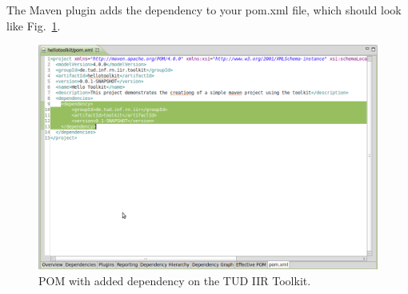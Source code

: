 \documentclass[a4paper,twoside]{book}      %
\begin{document}
The Maven plugin adds the dependency to your pom.xml file, which should look like Fig.~\ref{fig:pom01}.
\begin{figure}
\includegraphics[width=\textwidth]{img/ht06.png}
\caption{POM with added dependency on the TUD IIR Toolkit.}
\label{fig:pom01}
\end{figure}
\end{document}
